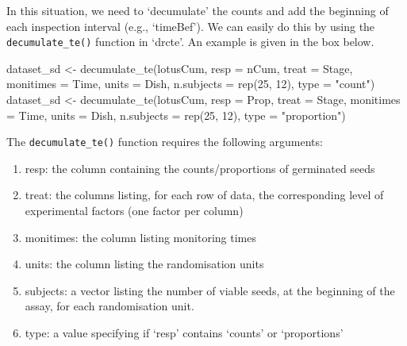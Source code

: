 \documentclass[
]{book}
\newenvironment{Shaded}{\begin{snugshade}}{\end{snugshade}}
\newcommand{\AttributeTok}[1]{\textcolor[rgb]{0.77,0.63,0.00}{#1}}
\newcommand{\DecValTok}[1]{\textcolor[rgb]{0.00,0.00,0.81}{#1}}
\newcommand{\FunctionTok}[1]{\textcolor[rgb]{0.00,0.00,0.00}{#1}}
\newcommand{\NormalTok}[1]{#1}
\newcommand{\OtherTok}[1]{\textcolor[rgb]{0.56,0.35,0.01}{#1}}
\newcommand{\StringTok}[1]{\textcolor[rgb]{0.31,0.60,0.02}{#1}}
\providecommand{\tightlist}{%
  \setlength{\itemsep}{0pt}\setlength{\parskip}{0pt}}
\begin{document}
In this situation, we need to `decumulate' the counts and add the beginning of each inspection interval (e.g., `timeBef'). We can easily do this by using the \texttt{decumulate\_te()} function in `drcte'. An example is given in the box below.

\begin{Shaded}
\begin{Highlighting}[]
\NormalTok{dataset\_sd }\OtherTok{\textless{}{-}} \FunctionTok{decumulate\_te}\NormalTok{(lotusCum,}
                            \AttributeTok{resp =}\NormalTok{ nCum, }
                            \AttributeTok{treat =}\NormalTok{ Stage,}
                            \AttributeTok{monitimes =}\NormalTok{ Time,}
                            \AttributeTok{units =}\NormalTok{ Dish, }
                            \AttributeTok{n.subjects =} \FunctionTok{rep}\NormalTok{(}\DecValTok{25}\NormalTok{, }\DecValTok{12}\NormalTok{),}
                            \AttributeTok{type =} \StringTok{"count"}\NormalTok{)}
\NormalTok{dataset\_sd }\OtherTok{\textless{}{-}} \FunctionTok{decumulate\_te}\NormalTok{(lotusCum,}
                            \AttributeTok{resp =}\NormalTok{ Prop, }
                            \AttributeTok{treat =}\NormalTok{ Stage,}
                            \AttributeTok{monitimes =}\NormalTok{ Time,}
                            \AttributeTok{units =}\NormalTok{ Dish, }
                            \AttributeTok{n.subjects =} \FunctionTok{rep}\NormalTok{(}\DecValTok{25}\NormalTok{, }\DecValTok{12}\NormalTok{),}
                            \AttributeTok{type =} \StringTok{"proportion"}\NormalTok{)}
\end{Highlighting}
\end{Shaded}

The \texttt{decumulate\_te()} function requires the following arguments:

\begin{enumerate}
\def\labelenumi{\arabic{enumi}.}
\tightlist
\item
  resp: the column containing the counts/proportions of germinated seeds
\item
  treat: the columns listing, for each row of data, the corresponding level of experimental factors (one factor per column)
\item
  monitimes: the column listing monitoring times
\item
  units: the column listing the randomisation units
\item
  subjects: a vector listing the number of viable seeds, at the beginning of the assay, for each randomisation unit.
\item
  type: a value specifying if `resp' contains `counts' or `proportions'
\end{enumerate}
\end{document}
